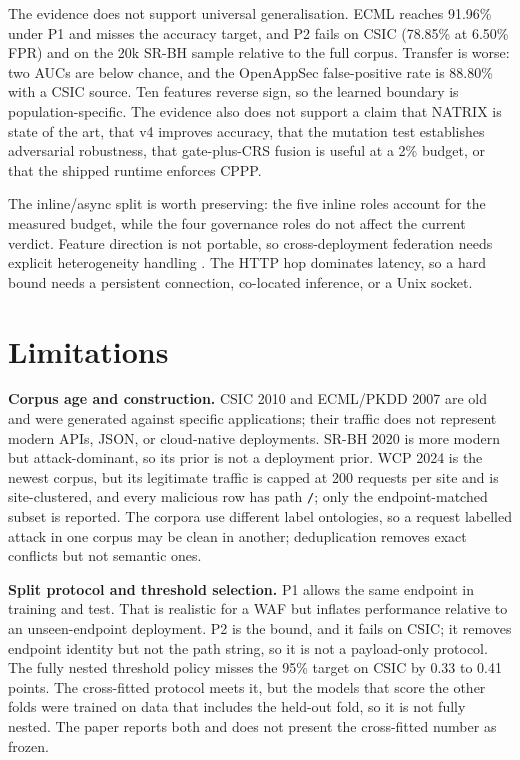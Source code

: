 \documentclass[preprint,11pt]{elsarticle}
\begin{document}
The evidence does not support universal generalisation. ECML reaches
91.96\% under P1 and misses the accuracy target, and P2 fails on CSIC
(78.85\% at 6.50\% FPR) and on the 20k SR-BH sample relative to the full
corpus. Transfer is worse: two AUCs are below chance, and the OpenAppSec
false-positive rate is 88.80\% with a CSIC source. Ten features reverse
sign, so the learned boundary is population-specific. The evidence also
does not support a claim that NATRIX is state of the art, that v4
improves accuracy, that the mutation test establishes adversarial
robustness, that gate-plus-CRS fusion is useful at a 2\% budget, or that
the shipped runtime enforces CPPP.

The inline/async split is worth preserving: the five inline roles
account for the measured budget, while the four governance roles do not
affect the current verdict. Feature direction is not portable, so
cross-deployment federation needs explicit heterogeneity handling
\citep{mcmahan2017communication, kairouz2021advances}. The HTTP hop
dominates latency, so a hard bound needs a persistent connection,
co-located inference, or a Unix socket.

\section{Limitations}\label{limitations}

\textbf{Corpus age and construction.} CSIC 2010 and ECML/PKDD 2007 are
old and were generated against specific applications; their traffic does
not represent modern APIs, JSON, or cloud-native deployments. SR-BH 2020
is more modern but attack-dominant, so its prior is not a deployment
prior. WCP 2024 is the newest corpus, but its legitimate traffic is
capped at 200 requests per site and is site-clustered, and every
malicious row has path \texttt{/\allowbreak{}}; only the endpoint-matched subset is
reported. The corpora use different label ontologies, so a request
labelled attack in one corpus may be clean in another; deduplication
removes exact conflicts but not semantic ones.

\textbf{Split protocol and threshold selection.} P1 allows the same
endpoint in training and test. That is realistic for a WAF but inflates
performance relative to an unseen-endpoint deployment. P2 is the bound,
and it fails on CSIC; it removes endpoint identity but not the path
string, so it is not a payload-only protocol. The fully nested threshold
policy misses the 95\% target on CSIC by 0.33 to 0.41 points. The
cross-fitted protocol meets it, but the models that score the other
folds were trained on data that includes the held-out fold, so it is not
fully nested. The paper reports both and does not present the
cross-fitted number as frozen.
\end{document}
